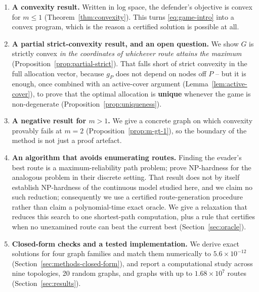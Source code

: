 \documentclass[11pt,a4paper]{article}
\theoremstyle{plain}
\theoremstyle{definition}
\begin{document}
\begin{enumerate}[leftmargin=2em,itemsep=0.3em]
\item \textbf{A convexity result.} Written in log space, the defender's
  objective is convex for $m\le 1$ (Theorem~\ref{thm:convexity}). This
  turns \eqref{eq:game-intro} into a convex program, which is the reason a
  certified solution is possible at all.

\item \textbf{A partial strict-convexity result, and an open question.}
  We show $G$ is strictly convex \emph{in the coordinates of whichever
  route attains the maximum} (Proposition~\ref{prop:partial-strict}). That
  falls short of strict convexity in the full allocation vector, because
  $g_P$ does not depend on nodes off $P$ -- but it is enough, once
  combined with an active-cover argument
  (Lemma~\ref{lem:active-cover}), to prove that the optimal allocation is
  \textbf{unique} whenever the game is non-degenerate
  (Proposition~\ref{prop:uniqueness}).

\item \textbf{A negative result for $m>1$.} We give a concrete graph on
  which convexity provably fails at $m=2$
  (Proposition~\ref{prop:m-gt-1}), so the boundary of the method is not
  just a proof artefact.

\item \textbf{An algorithm that avoids enumerating routes.} Finding the
  evader's best route is a maximum-reliability path problem;
  \citet{nguyen2023} prove NP-hardness for the analogous problem in their
  discrete setting. That result does not by itself establish NP-hardness of
  the continuous model studied here, and we claim no such reduction;
  consequently we use a certified route-generation procedure rather than
  claim a polynomial-time exact oracle. We give a relaxation that reduces
  this search to one shortest-path computation, plus a rule that certifies
  when no unexamined route can beat the current best
  (Section~\ref{sec:oracle}).

\item \textbf{Closed-form checks and a tested implementation.} We derive
  exact solutions for four graph families and match them numerically to
  $5.6\times10^{-12}$ (Section~\ref{sec:methods-closed-form}), and report a
  computational study across nine topologies, 20 random graphs, and graphs
  with up to $1.68\times10^7$ routes (Section~\ref{sec:results}).
\end{enumerate}
\end{document}
